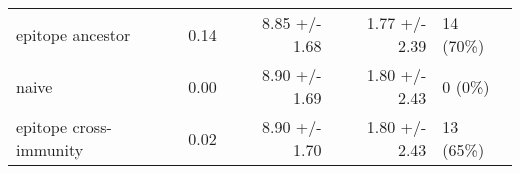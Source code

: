\begin{tabular*}{1.0\textwidth}{lrrrl}
                  epitope ancestor &         0.14 &                          8.85 +/- 1.68 &                                   1.77 +/- 2.39 &                               14 (70\%) \\
                             naive &         0.00 &                          8.90 +/- 1.69 &                                   1.80 +/- 2.43 &                                 0 (0\%) \\
            epitope cross-immunity &         0.02 &                          8.90 +/- 1.70 &                                   1.80 +/- 2.43 &                               13 (65\%) \\
\bottomrule
\end{tabular*}
